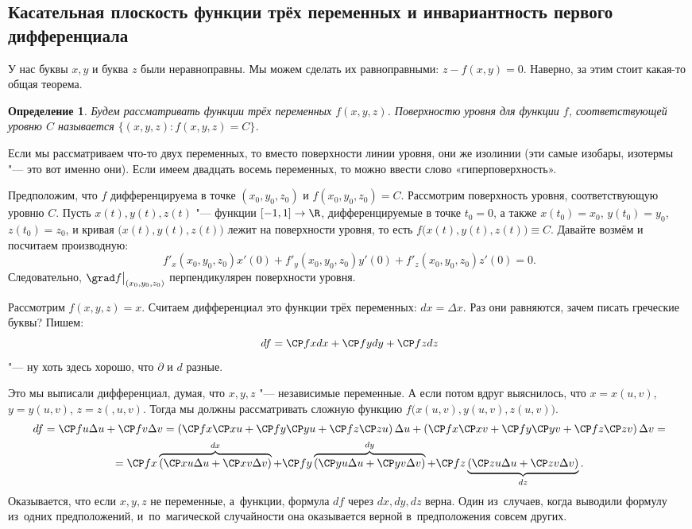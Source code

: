 \documentclass[a4paper,10pt,twoside]{article}
\newtheorem{Def}{Определение}[section]
\begin{document}
	\subsection{Касательная плоскость функции трёх переменных и инвариантность первого дифференциала} 
	 У нас буквы $x,y$ и буква $z$ были неравноправны. Мы можем сделать их равноправными: $z - f(x,y) = 0$.
	 Наверно, за этим стоит какая-то общая теорема.
	 
	 \begin{Def} Будем рассматривать функции трёх переменных $f(x,y,z)$. Поверхностю уровня
	 для функции $f$, соответствующей уровню $C$ называется $\big\{(x,y,z)\colon f(x,y,z) = C\big\}$.
	 \end{Def}
	 Если мы рассматриваем что-то двух переменных, то вместо поверхности линии уровня, они же изолинии (эти самые изобары, изотермы "--- это вот именно они).
	 Если имеем двадцать восемь переменных, то можно ввести слово «гиперповерхность».
	 
	 Предположим, что $f$ дифференцируема в точке $(x_0,y_0,z_0)$ и $f(x_0,y_0,z_0) = C$. Рассмотрим поверхность
	 уровня, соответствующую уровню $C$. Пусть $x(t),y(t),z(t)$ "--- функции $[-1,1] \to \R$, дифференцируемые в точке $t_0 = 0$, а также
	 $x(t_0) = x_0$, $y(t_0) = y_0$, $z(t_0)= z_0$, и кривая $\big(x(t),y(t),z(t)\big)$ лежит на поверхности уровня, то есть
	 $f\big(x(t),y(t),z(t)\big)\equiv C$. Давайте возмём и посчитаем производную:
	 \[f'_x(x_0,y_0,z_0)x'(0) + f'_y(x_0,y_0,z_0)y'(0) + f'_z(x_0,y_0,z_0)z'(0) = 0.\]
	 Следовательно, $\grad f\big|_{(x_0,y_0,z_0)}$ перпендикулярен поверхности уровня.
	 
	 Рассмотрим $f(x,y,z) = x$. Считаем дифференциал это функции трёх переменных: $dx = \Delta x$.
	 Раз они равняются, зачем писать греческие буквы? Пишем:
	 \[df = \CP fx dx + \CP fy dy + \CP fz dz\]
	 "--- ну хоть здесь хорошо, что $\partial $ и $d$ разные.
	 
	 Это мы выписали дифференциал, думая, что $x,y,z$ "--- независимые переменные. А если потом вдруг выяснилось, что
	 $x=x(u,v)$, $y = y(u,v)$, $z=z(,u,v)$. Тогда мы должны рассматривать сложную функцию $f\big(x(u,v),y(u,v),z(u,v)\big)$.
	 \begin{multline*}
	 df = \CP fu\Delta u + \CP fv \Delta v 
	 = \left(\CP fx\CP xu + \CP fy\CP yu+\CP fz\CP zu\right)\Delta u +
	  \left(\CP fx\CP xv + \CP fy\CP yv+\CP fz\CP zv\right)\Delta v  = \\
	 =\CP fx\overbrace{\left(\CP xu \Delta u + \CP xv\Delta v\right)}^{dx} +
	 \CP fy\overbrace{\left(\CP yu \Delta u + \CP yv\Delta v\right)}^{dy} +
	 \CP fz\underbrace{\left(\CP zu \Delta u + \CP zv\Delta v\right)}_{dz}.  
	 \end{multline*}
	 Оказывается, что если $x,y,z$ не переменные, а~функции, формула $df$ через $dx,dy,dz$ верна.
	 Один из~случаев, когда выводили формулу из~одних предположений, и~по~магической случайности она оказывается
	 верной в~предположения совсем других.
	 
\end{document}
